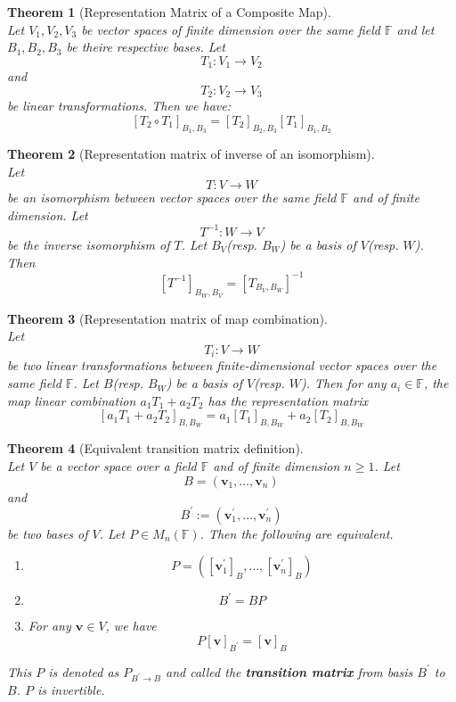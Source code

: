 \documentclass[12pt]{article}
\newtheorem{theorem}{Theorem}[section]
\theoremstyle{definition}
\begin{document}
\begin{theorem}[Representation Matrix of a Composite Map]
\hfill\\\normalfont Let $V_1, V_2,V_3$ be vector spaces of finite dimension over the same field $\mathbb{F}$ and let $B_1, B_2, B_3$ be theire respective bases. Let
\[
T_1:V_1\to V_2
\]
and
\[
T_2:V_2\to V_3
\]
be linear transformations. Then we have:
\[
[T_2\circ T_1]_{B_1,B_3}=[T_2]_{B_2,B_3}[T_1]_{B_1,B_2}
\]
\end{theorem}
\begin{theorem}[Representation matrix of inverse of an isomorphism]
\hfill\\\normalfont Let 
\[
T:V\to W
\]
be an isomorphism between vector spaces over the same field $\mathbb{F}$ and of finite dimension. Let
\[
T^{-1}:W\to V
\]
be the inverse isomorphism of $T$. Let $B_V$(resp. $B_W$) be a basis of $V$(resp. $W$). Then
\[
[T^{-1}]_{B_W,B_V} = [T_{B_V,B_W}]^{-1}
\]
\end{theorem}
\begin{theorem}[Representation matrix of map combination]
\hfill\\\normalfont Let
\[
T_i:V\to W
\]
be two linear transformations between finite-dimensional vector spaces over the same field $\mathbb{F}$. Let $B$(resp. $B_W$) be a basis of $V$(resp. $W$). Then for any $a_i\in\mathbb{F}$, the map linear combination $a_1T_1+a_2T_2$ has the representation matrix
\[
[a_1T_1+a_2T_2]_{B,B_W} = a_1[T_1]_{B,B_W}+a_2[T_2]_{B,B_W}
\]
\end{theorem}
\begin{theorem}[Equivalent transition matrix definition]
\hfill\\\normalfont Let $V$ be a vector space over a field $\mathbb{F}$ and of finite dimension $n\geq 1$. Let
\[
B=(\mathbf{v}_1,\ldots, \mathbf{v}_n)
\]
and
\[
B^\prime:=(\mathbf{v}^\prime_1,\ldots,\mathbf{v}^\prime_n)
\]
be two bases of $V$. Let $P\in M_n(\mathbb{F})$. Then the following are equivalent.
\begin{enumerate}[label=(\arabic*)]
\item 
\[
P=([\mathbf{v}_1^\prime]_B, \ldots, [\mathbf{v}_n^\prime]_B)
\]
\item
\[
B^\prime = BP
\]
\item For any $\mathbf{v}\in V$, we have
\[
P[\mathbf{v}]_{B^\prime} = [\mathbf{v}]_B
\]
\end{enumerate}
This $P$ is denoted as $P_{B^\prime\to B}$ and called the \textbf{transition matrix} from basis $B^\prime$ to $B$. $P$ is invertible.  
\end{theorem}
\end{document}

